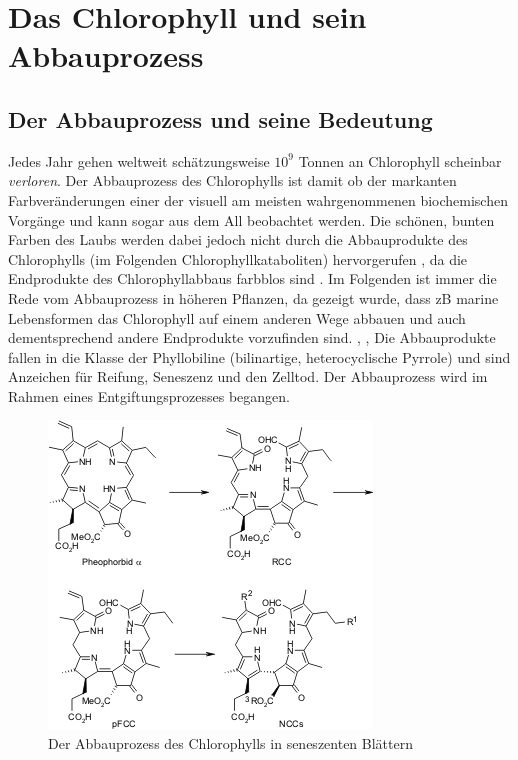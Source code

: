 \chapter{Das Chlorophyll und sein Abbauprozess}

\section{Der Abbauprozess und seine Bedeutung}

Jedes Jahr gehen weltweit schätzungsweise $10^{9}$ Tonnen an Chlorophyll scheinbar \textit{verloren}. Der Abbauprozess des Chlorophylls ist damit ob der markanten Farbveränderungen einer der visuell am meisten wahrgenommenen biochemischen Vorgänge und kann sogar aus dem All beobachtet werden. \cite{ChlorophyllBreakdown} Die schönen, bunten Farben des Laubs werden dabei jedoch nicht durch die Abbauprodukte des Chlorophylls (im Folgenden Chlorophyllkataboliten) hervorgerufen  \cite{DegradationChlorophyll}, da die Endprodukte des Chlorophyllabbaus farbblos sind \cite{ChlorophyllBreakdown}. Im Folgenden ist immer die Rede vom Abbauprozess in höheren Pflanzen, da gezeigt wurde, dass \gls{zB} marine Lebensformen das Chlorophyll auf einem anderen Wege abbauen und auch dementsprechend andere Endprodukte vorzufinden sind. \cite{ChlorophyllBreakdown}, \cite{ErsterKatabolit}, \cite{ChlorophyllCataboliteDifferent} Die Abbauprodukte fallen in die Klasse der Phyllobiline (bilinartige, heterocyclische Pyrrole) und sind Anzeichen für Reifung, Seneszenz und den Zelltod. Der Abbauprozess wird im Rahmen eines Entgiftungsprozesses begangen. \cite{ChlorophyllKatabolitenalsZeichenReifung}

\begin{figure}[!hbtp]
  \centering
  \includegraphics[scale=0.56]{figures/Kapitel2/VWA_Schema_Chlorophyllabbau.png}
  \caption[Abbauprozess des Chlorophylls, Quelle: http://www.organische-chemie.ch/chemie/2007nov/antioxidantien.shtm (Zugegriffen am: 05.11.2017)]{Der Abbauprozess des Chlorophylls in seneszenten Blättern}
  \label{fig:Chlorophyllabbau}
\end{figure}

